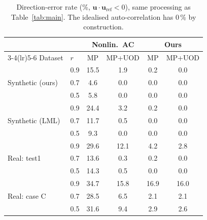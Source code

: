 \begin{table}[t]
\centering
\caption{Direction-error rate (\%, $\mathbf{u}\cdot\mathbf{u}_\mathrm{ref}<0$), same processing as Table~\ref{tab:main}. The idealised auto-correlation has 0\,\% by construction.}
\label{tab:direction}
\small
\begin{tabular}{llcccc}
\toprule
 & & \multicolumn{2}{c}{Nonlin.\ AC} & \multicolumn{2}{c}{Ours} \\
\cmidrule(lr){3-4}\cmidrule(lr){5-6}
Dataset & $r$ & MP & MP+UOD & MP & MP+UOD \\
\midrule
\multirow{3}{*}{Synthetic (ours)} & 0.9 & 15.5 & 1.9 & 0.2 & 0.0 \\
 & 0.7 & 4.6 & 0.0 & 0.0 & 0.0 \\
 & 0.5 & 5.8 & 0.0 & 0.0 & 0.0 \\
\midrule
\multirow{3}{*}{Synthetic (LML)} & 0.9 & 24.4 & 3.2 & 0.2 & 0.0 \\
 & 0.7 & 11.7 & 0.5 & 0.0 & 0.0 \\
 & 0.5 & 9.3 & 0.0 & 0.0 & 0.0 \\
\midrule
\multirow{3}{*}{Real: test1} & 0.9 & 29.6 & 12.1 & 4.2 & 2.8 \\
 & 0.7 & 13.6 & 0.3 & 0.2 & 0.0 \\
 & 0.5 & 14.3 & 0.5 & 0.0 & 0.0 \\
\midrule
\multirow{3}{*}{Real: case C} & 0.9 & 34.7 & 15.8 & 16.9 & 16.0 \\
 & 0.7 & 28.5 & 6.5 & 2.1 & 2.1 \\
 & 0.5 & 31.6 & 9.4 & 2.9 & 2.6 \\
\bottomrule
\end{tabular}
\end{table}
